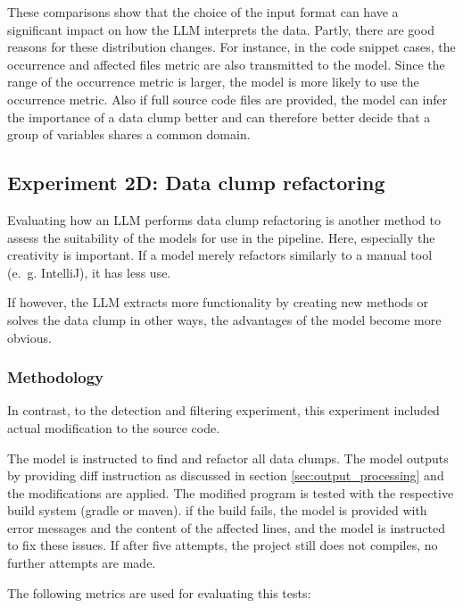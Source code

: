 These comparisons show that the choice of the input format can have a significant impact on how the \ac{LLM} interprets the data. Partly, there are good reasons for these distribution changes. For instance, in the code snippet cases, the occurrence and affected files metric are also transmitted to the model. Since the range of the occurrence metric is larger, the model is more likely to use the occurrence metric. Also if full source code files are provided, the model can infer the importance of a data clump better and can therefore better decide that a group of variables shares a common domain. 


\subsection{Experiment 2D: Data clump refactoring}

Evaluating how an \ac{LLM} performs data clump refactoring is another method to assess the suitability of the models for use in the pipeline. Here, especially the creativity is important. If a model merely refactors similarly to a manual tool (e.~g. IntelliJ), it has less use.

If however, the \ac{LLM} extracts more functionality by creating new methods or solves the data clump in other ways, the advantages of the model become more obvious.



\subsubsection{Methodology}

In contrast, to the detection and filtering experiment, this experiment included actual modification to the source code. 

The model is instructed to find and refactor all data clumps. 
The model outputs by providing diff instruction as discussed in section \ref{sec:output_processing} and the modifications are applied.  The modified program is tested with the respective build system (gradle or maven). if the build fails, the model is provided with error messages and the content of the affected lines, and the model is instructed to fix these issues. If after five attempts, the project still does not compiles, no further attempts are made. 

The following metrics are used for evaluating this tests:

